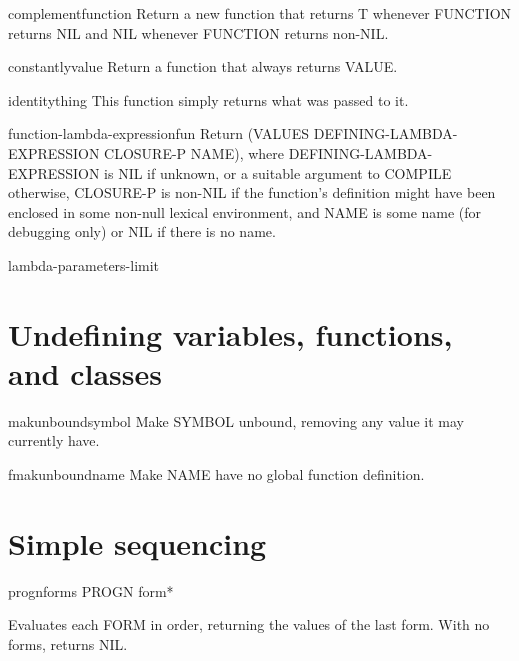 \documentclass[10pt,english]{book}
\begin{document}
\begin{function}{complement}{function}
  Return a new function that returns T whenever FUNCTION returns NIL and
   NIL whenever FUNCTION returns non-NIL.
\end{function}

\begin{function}{constantly}{value}
  Return a function that always returns VALUE.
\end{function}

\begin{function}{identity}{thing}
  This function simply returns what was passed to it.
\end{function}

\begin{function}{function-lambda-expression}{fun}
  Return (VALUES DEFINING-LAMBDA-EXPRESSION CLOSURE-P NAME), where
  DEFINING-LAMBDA-EXPRESSION is NIL if unknown, or a suitable argument
  to COMPILE otherwise, CLOSURE-P is non-NIL if the function's definition
  might have been enclosed in some non-null lexical environment, and
  NAME is some name (for debugging only) or NIL if there is no name.
\end{function}

\begin{constant}{lambda-parameters-limit}{}
  
\end{constant}

\section{Undefining variables, functions, and classes}
\label{sec:undef-vari-funct}

\begin{function}{makunbound}{symbol}
  Make SYMBOL unbound, removing any value it may currently have.
\end{function}

\begin{function}{fmakunbound}{name}
  Make NAME have no global function definition.
\end{function}

\section{Simple sequencing}
\label{sec:simple-sequencing}

\begin{specialop}{progn}{\rest forms}
  PROGN form*

Evaluates each FORM in order, returning the values of the last form. With no
forms, returns NIL.
\end{specialop}
\end{document}
